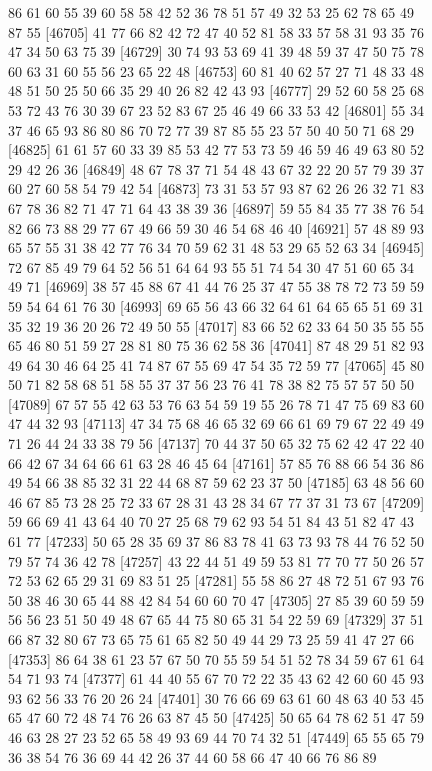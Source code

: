 \documentclass{article}
\begin{document}
\begin{figure}[H]
\begin{Schunk}
\begin{Soutput}
[46681] 86 61 60 55 39 60 58 58 42 52 36 78 51 57 49 32 53 25 62 78 65 49 87 55
[46705] 41 77 66 82 42 72 47 40 52 81 58 33 57 58 31 93 35 76 47 34 50 63 75 39
[46729] 30 74 93 53 69 41 39 48 59 37 47 50 75 78 60 63 31 60 55 56 23 65 22 48
[46753] 60 81 40 62 57 27 71 48 33 48 48 51 50 25 50 66 35 29 40 26 82 42 43 93
[46777] 29 52 60 58 25 68 53 72 43 76 30 39 67 23 52 83 67 25 46 49 66 33 53 42
[46801] 55 34 37 46 65 93 86 80 86 70 72 77 39 87 85 55 23 57 50 40 50 71 68 29
[46825] 61 61 57 60 33 39 85 53 42 77 53 73 59 46 59 46 49 63 80 52 29 42 26 36
[46849] 48 67 78 37 71 54 48 43 67 32 22 20 57 79 39 37 60 27 60 58 54 79 42 54
[46873] 73 31 53 57 93 87 62 26 26 32 71 83 67 78 36 82 71 47 71 64 43 38 39 36
[46897] 59 55 84 35 77 38 76 54 82 66 73 88 29 77 67 49 66 59 30 46 54 68 46 40
[46921] 57 48 89 93 65 57 55 31 38 42 77 76 34 70 59 62 31 48 53 29 65 52 63 34
[46945] 72 67 85 49 79 64 52 56 51 64 64 93 55 51 74 54 30 47 51 60 65 34 49 71
[46969] 38 57 45 88 67 41 44 76 25 37 47 55 38 78 72 73 59 59 59 54 64 61 76 30
[46993] 69 65 56 43 66 32 64 61 64 65 65 51 69 31 35 32 19 36 20 26 72 49 50 55
[47017] 83 66 52 62 33 64 50 35 55 55 65 46 80 51 59 27 28 81 80 75 36 62 58 36
[47041] 87 48 29 51 82 93 49 64 30 46 64 25 41 74 87 67 55 69 47 54 35 72 59 77
[47065] 45 80 50 71 82 58 68 51 58 55 37 37 56 23 76 41 78 38 82 75 57 57 50 50
[47089] 67 57 55 42 63 53 76 63 54 59 19 55 26 78 71 47 75 69 83 60 47 44 32 93
[47113] 47 34 75 68 46 65 32 69 66 61 69 79 67 22 49 49 71 26 44 24 33 38 79 56
[47137] 70 44 37 50 65 32 75 62 42 47 22 40 66 42 67 34 64 66 61 63 28 46 45 64
[47161] 57 85 76 88 66 54 36 86 49 54 66 38 85 32 31 22 44 68 87 59 62 23 37 50
[47185] 63 48 56 60 46 67 85 73 28 25 72 33 67 28 31 43 28 34 67 77 37 31 73 67
[47209] 59 66 69 41 43 64 40 70 27 25 68 79 62 93 54 51 84 43 51 82 47 43 61 77
[47233] 50 65 28 35 69 37 86 83 78 41 63 73 93 78 44 76 52 50 79 57 74 36 42 78
[47257] 43 22 44 51 49 59 53 81 77 70 77 50 26 57 72 53 62 65 29 31 69 83 51 25
[47281] 55 58 86 27 48 72 51 67 93 76 50 38 46 30 65 44 88 42 84 54 60 60 70 47
[47305] 27 85 39 60 59 59 56 56 23 51 50 49 48 67 65 44 75 80 65 31 54 22 59 69
[47329] 37 51 66 87 32 80 67 73 65 75 61 65 82 50 49 44 29 73 25 59 41 47 27 66
[47353] 86 64 38 61 23 57 67 50 70 55 59 54 51 52 78 34 59 67 61 64 54 71 93 74
[47377] 61 44 40 55 67 70 72 22 35 43 62 42 60 60 45 93 93 62 56 33 76 20 26 24
[47401] 30 76 66 69 63 61 60 48 63 40 53 45 65 47 60 72 48 74 76 26 63 87 45 50
[47425] 50 65 64 78 62 51 47 59 46 63 28 27 23 52 65 58 49 93 69 44 70 74 32 51
[47449] 65 55 65 79 36 38 54 76 36 69 44 42 26 37 44 60 58 66 47 40 66 76 86 89

\end{Soutput}
\end{Schunk}
\end{figure}
\end{document}
